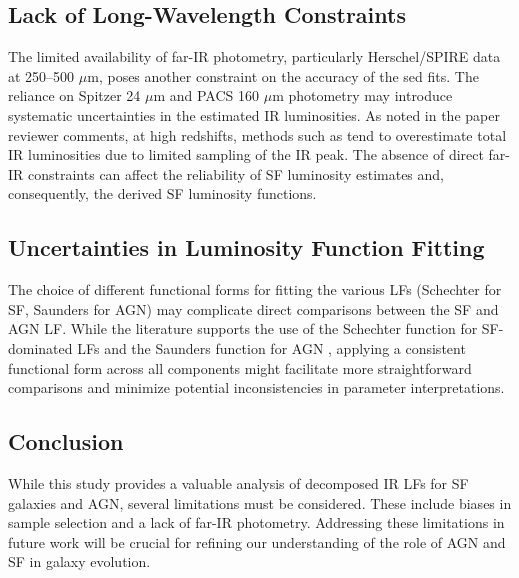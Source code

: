\subsection{Lack of Long-Wavelength Constraints}
The limited availability of far-IR photometry, particularly Herschel/SPIRE data at 250–500 $\mu$m, poses another constraint on the accuracy of the \gls{sed} fits. The reliance on Spitzer 24 $\mu$m and PACS 160 $\mu$m photometry may introduce systematic uncertainties in the estimated IR luminosities. As noted in the paper reviewer comments, at high redshifts, methods such as \cite{wuyts_fireworks_2008} tend to overestimate total IR luminosities due to limited sampling of the IR peak. The absence of direct far-IR constraints can affect the reliability of SF luminosity estimates and, consequently, the derived SF luminosity functions.

\subsection{Uncertainties in Luminosity Function Fitting}
The choice of different functional forms for fitting the various LFs (Schechter for SF, Saunders for AGN) may complicate direct comparisons between the SF and AGN LF. While the literature supports the use of the Schechter function for SF-dominated LFs \citep{wu_mid-infrared_2011} and the Saunders function for AGN \citep{symeonidis_agn_2021}, applying a consistent functional form across all components might facilitate more straightforward comparisons and minimize potential inconsistencies in parameter interpretations.

\subsection{Conclusion}
While this study provides a valuable analysis of decomposed IR LFs for SF galaxies and AGN, several limitations must be considered. These include biases in sample selection and a lack of far-IR photometry. Addressing these limitations in future work will be crucial for refining our understanding of the role of AGN and SF in galaxy evolution.